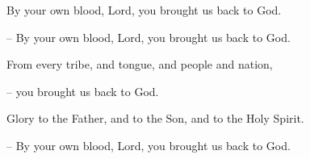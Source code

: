 By your own blood, Lord, you brought us back to God.\par
– By your own blood, Lord, you brought us back to God.\par
\par
From every tribe, and tongue, and people and nation,\par
– you brought us back to God.\par
\par
Glory to the Father, and to the Son, and to the Holy Spirit.\par
– By your own blood, Lord, you brought us back to God.\par